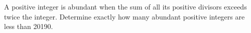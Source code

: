 A positive integer is abundant when the sum of all its positive divisors exceeds twice the integer. Determine exactly how many abundant positive integers are less than 20190.

